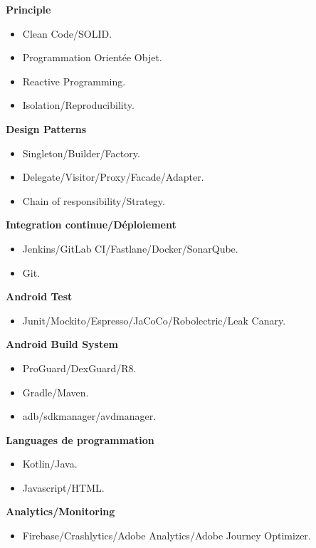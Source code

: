 \documentclass[10pt,a4paper,withhyper]{altacv}
\begin{document}
\begin{paracol}{2}
\textbf{Principle}

\begin{itemize}
	\item Clean Code/SOLID.
	\item Programmation Orientée Objet.
	\item Reactive Programming.
	\item Isolation/Reproducibility.
\end{itemize}
\divider

\textbf{Design Patterns}

\begin{itemize}
	\item Singleton/Builder/Factory.
	\item Delegate/Visitor/Proxy/Facade/Adapter.
	\item Chain of responsibility/Strategy.
\end{itemize}
\divider

\textbf{Integration continue/Déploiement}

\begin{itemize}
	\item Jenkins/GitLab CI/Fastlane/Docker/SonarQube.
	\item Git.
\end{itemize}
\divider

\textbf{Android Test}

\begin{itemize}
	\item Junit/Mockito/Espresso/JaCoCo/Robolectric/Leak Canary.
\end{itemize}
\divider

\textbf{Android Build System}

\begin{itemize}
	\item ProGuard/DexGuard/R8.
	\item Gradle/Maven.
	\item adb/sdkmanager/avdmanager.
\end{itemize}
\divider

\textbf{Languages de programmation}

\begin{itemize}
	\item Kotlin/Java.
	\item Javascript/HTML.
\end{itemize}
\divider

\textbf{Analytics/Monitoring}

\begin{itemize}
	\item Firebase/Crashlytics/Adobe Analytics/Adobe Journey Optimizer.
\end{itemize}
\divider


\end{paracol}
\end{document}
